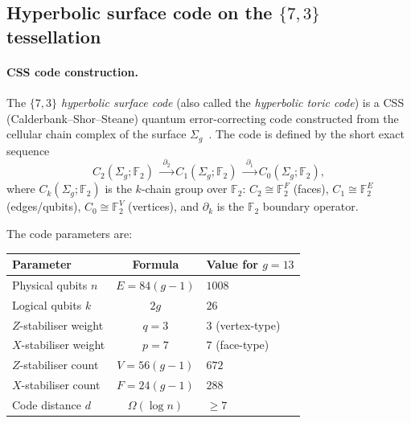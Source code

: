 \documentclass[11pt,oneside]{amsbook}
\numberwithin{equation}{section}
\theoremstyle{plain}
\theoremstyle{definition}
\theoremstyle{remark}
\begin{document}
\subsection{Hyperbolic surface code on the $\{7,3\}$ tessellation}
\label{subsec:hk_surface_code}

\paragraph{CSS code construction.}
The \emph{$\{7,3\}$ hyperbolic surface code} (also called the
\emph{hyperbolic toric code}) is a CSS (Calderbank--Shor--Steane) quantum
error-correcting code constructed from the cellular chain complex of the
surface $\Sigma_g$~\cite{Freedman2002,BombinDelgado2007}.  The code is defined by
the short exact sequence
\begin{equation}
  C_2(\Sigma_g;\mathbb{F}_2)
  \;\xrightarrow{\;\partial_2\;}
  C_1(\Sigma_g;\mathbb{F}_2)
  \;\xrightarrow{\;\partial_1\;}
  C_0(\Sigma_g;\mathbb{F}_2),
\label{eq:chain_complex}
\end{equation}
where $C_k(\Sigma_g;\mathbb{F}_2)$ is the $k$-chain group over $\mathbb{F}_2$:
$C_2 \cong \mathbb{F}_2^F$ (faces), $C_1 \cong \mathbb{F}_2^E$ (edges/qubits),
$C_0 \cong \mathbb{F}_2^V$ (vertices), and $\partial_k$ is the $\mathbb{F}_2$
boundary operator.

The code parameters are:
\begin{center}
\renewcommand{\arraystretch}{1.4}
\begin{tabular}{lcl}
\toprule
\textbf{Parameter} & \textbf{Formula} & \textbf{Value for $g=13$} \\
\midrule
Physical qubits $n$ & $E = 84(g-1)$ & $1008$ \\
Logical qubits $k$ & $2g$ & $26$ \\
$Z$-stabiliser weight & $q = 3$ & $3$ (vertex-type) \\
$X$-stabiliser weight & $p = 7$ & $7$ (face-type) \\
$Z$-stabiliser count & $V = 56(g-1)$ & $672$ \\
$X$-stabiliser count & $F = 24(g-1)$ & $288$ \\
Code distance $d$ & $\Omega(\log n)$ & $\ge 7$ \\
\bottomrule
\end{tabular}
\end{center}
\end{document}
